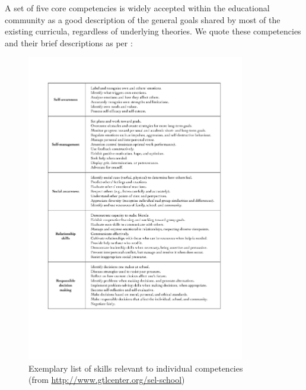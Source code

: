\documentclass[prodmode,acmtochi]{acmsmall}
\begin{document}
%

A set of five core competencies is widely accepted within the educational community \cite{Zins2007,Durlak2011,CASEL2003,CASEL2013} as a good description of the general goals shared by most of the existing curricula, regardless of underlying theories. We quote these competencies and their brief descriptions as per :
%

\begin{figure}
  \centering
	\includegraphics[width=0.85\textwidth]{images/Skills-list.pdf}
	\caption{Exemplary list of skills relevant to individual competencies \\(from \url{http://www.gtlcenter.org/sel-school})}
	\label{fig:skillsList}
\end{figure}
\end{document}

